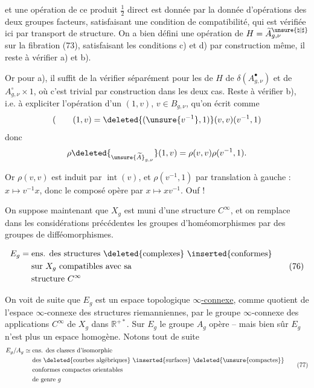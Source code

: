 
et une opération de ce produit \(\frac12\) direct est donnée  par  la donnée d'opérations des deux groupes facteurs, satisfaisant une condition de compatibilité, qui est vérifiée ici par transport de structure. On a bien défini une opération de \(H=\widetilde A_{g,\nu}^{\unsure{\natural|\sharp}}\) sur la fibration (73),  satisfaisant les conditions c) et d) par construction même, il reste à vérifier a) et b).

Or pour a), il suffit de la vérifier séparément pour les  de \(H\) de \(\delta(A_{g,\nu}^{\bullet})\) et de \(A_{g,\nu}^{\circ}\times 1\), où c'est trivial par construction dans les deux cas. Reste à vérifier b), i.e. à expliciter l'opération d'un  \((1,v)\), \(v\in B_{g,\nu}\), qu'on écrit comme
\[
 (\qquad (1,v)=\deleted{(\unsure{v^{-1}},1)}(v,v)(v^{-1},1)
\]
donc
\[
 \rho\deleted{_{\unsure{\widetilde A}_{g,\nu}}}(1,v)=\rho(v,v)\rho(v^{-1},1).
\]

Or \(\rho(v,v)\) est induit par \(\operatorname{int}(v)\),  et \(\rho(v^{-1},1)\) par translation à gauche : \(x\mapsto v^{-1}x\), donc le composé opère par \(x\mapsto xv^{-1}\). Ouf !


On suppose maintenant que \(X_g\) est muni d'une structure \(C^\infty\), et on remplace dans les considérations  précédentes les groupes d'homéomorphismes par des groupes de difféomorphismes.

\[
 \begin{aligned}
 E_g={}&\text{ens. des structures \deleted{complexes} \inserted{conformes}}\\
 &\text{sur }X_g\text{ compatibles avec sa}\\
 &\text{structure }C^\infty
 \end{aligned}
 \tag{76}
\]

 On voit de suite que \(E_g\) est un espace topologique \uline{\(\infty\)-connexe}, comme quotient de l'espace \(\infty\)-connexe  des structures riemanniennes, par le  groupe \(\infty\)-connexe des applications \(C^\infty\) de \(X_g\) dans \(\mathbb R^{+*}\). Sur \(E_g\) le groupe \(A_g\) opère -- mais bien sûr \(E_g\) n'est plus un espace homogène. Notons tout de suite
\[
 \begin{aligned}
 E_g/A_g\simeq{}&\text{ens. des classes d'isomorphie}\\
 &\text{des \deleted{courbes algébriques} \inserted{surfaces} \deleted{\unsure{compactes}}}\\
 &\text{conformes compactes orientables}\\
 &\text{de genre }g
 \end{aligned}
 \tag{77}
\]

